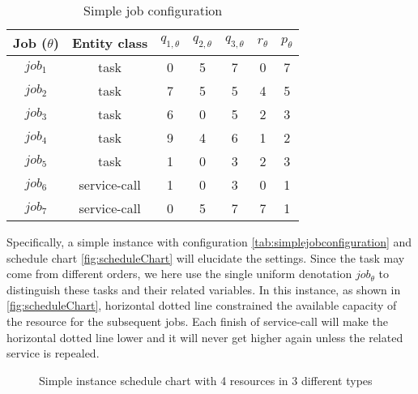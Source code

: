 \begin{table}[htbp]
  \centering
  \scriptsize
  \caption{Simple job configuration}
    \begin{tabular}{ccccccc}
    \toprule
    Job ($\theta$) & Entity class& $q_{1,\theta}$ & $q_{2,\theta}$ & $q_{3,\theta}$ & $r_\theta$ & $p_\theta$ \\
    \midrule
    $job_1$ & task& 0     & 5     & 7     & 0     & 7 \\
    $job_2$ & task& 7     & 5     & 5     & 4     & 5 \\
    $job_3$ & task& 6     & 0     & 5     & 2     & 3 \\
    $job_4$ & task& 9	 & 4  & 6 & 1 &2 \\
    $job_5$ & task& 1 & 0 & 3 & 2 & 3\\
    $job_6$ & service-call& 1     & 0     & 3    & 0     & 1 \\
    $job_7$ & service-call& 0     & 5     & 7     & 7     & 1 \\
    \bottomrule
    \end{tabular}%
  \label{tab:simplejobconfiguration}%
\end{table}%

Specifically, a simple instance with configuration \autoref{tab:simplejobconfiguration} and schedule chart \autoref{fig:scheduleChart} will elucidate the settings.
Since the task may come from different orders, we here use the single uniform denotation $job_\theta$ to distinguish these tasks and their related variables. In this instance, as shown in \autoref{fig:scheduleChart}, horizontal dotted line constrained the available capacity of the resource for the subsequent jobs. Each finish of service-call will make the horizontal dotted line lower and it will never get higher again unless the related service is repealed.


\begin{figure}[htbp]
	\centering
	\large
	\resizebox{.9\textwidth}{!}{}
	\caption{Simple instance schedule chart with 4 resources in 3 different types}
	\label{fig:scheduleChart}
\end{figure}

